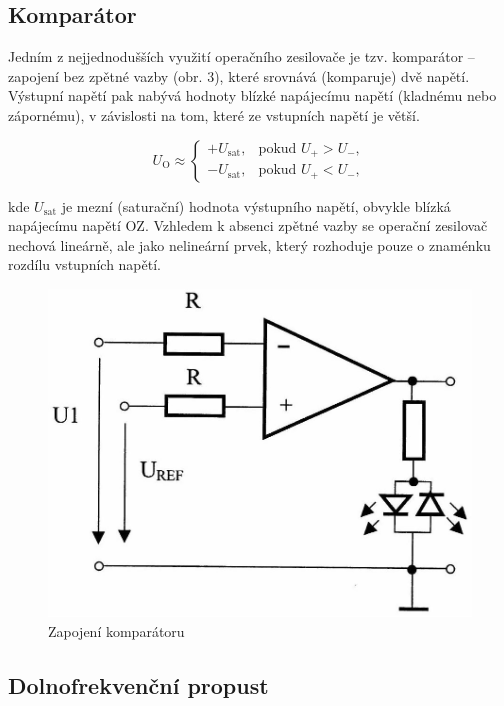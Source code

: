 \documentclass[czech,11pt,a4paper]{article}
\begin{document}
\begin{multicols}{2}
		\subsection{Komparátor}
		
		Jedním z nejjednodušších využití operačního zesilovače je tzv. komparátor – zapojení bez zpětné vazby (obr. 3), které srovnává (komparuje) dvě napětí. Výstupní napětí pak nabývá hodnoty blízké napájecímu napětí (kladnému nebo zápornému), v závislosti na tom, které ze vstupních napětí je větší.
		
		\begin{equation}
			U_\mathrm{O} \approx 
			\begin{cases}
				+U_\mathrm{sat}, & \text{pokud } U_+ > U_-, \\
				-U_\mathrm{sat}, & \text{pokud } U_+ < U_-,
			\end{cases}
		\end{equation}
		
		kde $U_\mathrm{sat}$ je mezní (saturační) hodnota výstupního napětí, obvykle blízká napájecímu napětí OZ. Vzhledem k absenci zpětné vazby se operační zesilovač nechová lineárně, ale jako nelineární prvek, který rozhoduje pouze o znaménku rozdílu vstupních napětí.
		
		\begin{figure}[H]
			\centering
			\includegraphics[width=0.8\linewidth]{komp}
			\caption{Zapojení komparátoru}
		\end{figure}
		
		\subsection{Dolnofrekvenční propust}
		

\end{multicols}
\end{document}
